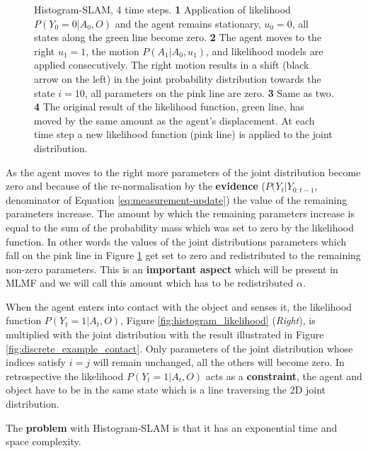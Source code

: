 \begin{figure}
  \caption{Histogram-SLAM, 4 time steps. \textbf{1} Application of likelihood $P(Y_0=0|A_0,O)$ and the agent remains stationary, $u_0=0$, all states along the green line become zero.
  \textbf{2} The agent moves to the right $u_1=1$, the motion $P(A_1|A_0,u_1)$, and likelihood models are applied consecutively. The right motion results in a shift (black arrow on the left) in the joint probability 
  distribution towards the state $i=10$, all parameters on the pink line are zero. \textbf{3} Same as two. \textbf{4} The original result of the likelihood function,
  green line, has moved by the same amount as the agent's displacement. At each time step a new likelihood function (pink line) is applied to the joint distribution.}
  \label{fig:discrete_example}
\end{figure}

As the agent moves to the right more parameters of the joint distribution become zero and because 
of the re-normalisation by the \textbf{evidence} ($P(Y_t|Y_{0:t-1}$, denominator of Equation \ref{eq:measurement-update}) the value of the remaining 
parameters increase. The amount by which the remaining parameters increase is equal to the sum of the probability mass which was set to zero by the likelihood function.
In other words the values of the joint distributions parameters which fall on the pink line in Figure \ref{fig:discrete_example} get set to zero and redistributed to the 
remaining non-zero parameters. This is an \textbf{important aspect} which will be present in MLMF and we will call this amount which has to be redistributed $\alpha$.

When the agent enters into contact with the object and senses it, the likelihood function $P(Y_t=1|A_t,O)$, Figure \ref{fig:histogram_likelihood} (\textit{Right}), is 
multiplied with the joint distribution with the result illustrated in Figure \ref{fig:discrete_example_contact}. Only parameters of the joint distribution whose indices
satisfy $i = j$ will remain unchanged, all the others will become zero. In retrospective the likelihood $P(Y_t=1|A_t,O)$ acts as a \textbf{constraint}, the agent and 
object have to be in the same state which is a line traversing the 2D joint distribution.

The \textbf{problem} with Histogram-SLAM is that it has an exponential time and space complexity. 


